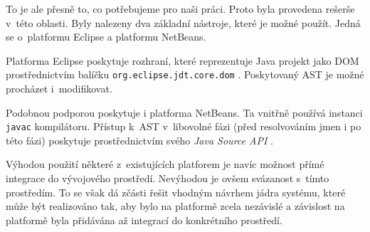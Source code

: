 To je ale přesně to, co potřebujeme pro naši práci. Proto byla provedena rešerše v~této oblasti. Byly nalezeny dva základní nástroje, které je možné použít. Jedná se o~platformu Eclipse a platformu NetBeans.

Platforma Eclipse poskytuje rozhraní, které reprezentuje Java projekt jako DOM prostřednictvím balíčku \verb+org.eclipse.jdt.core.dom+ \cite{parsertools:eclipsejdt}. Poskytovaný AST je možné procházet i~modifikovat.

Podobnou podporou poskytuje i platforma NetBeans. Ta vnitřně používá instanci \verb+javac+ kompilátoru. Přístup k~AST v~libovolné fázi (před resolvováním jmen i po této fázi) poskytuje prostřednictvím svého \emph{Java Source API} \cite{parsertools:javasourcejavadoc}.

Výhodou použití některé z~existujících platforem je navíc možnost přímé integrace do vývojového prostředí. Nevýhodou je ovšem svázanost s~tímto prostředím. To se však dá zčásti řešit vhodným návrhem jádra systému, které může být realizováno tak, aby bylo na platformě zcela nezávislé a závislost na platformě byla přidávána až integrací do konkrétního prostředí.
